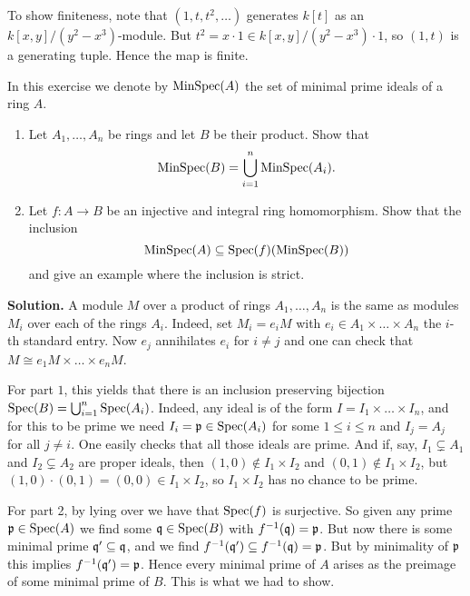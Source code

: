 \documentclass[a4paper,11pt]{article}
\begin{document}
To show finiteness, note that $(1, t, t^2, \dots)$ generates 
$k[t]$ as an $k[x,y]/(y^2-x^3)$-module. But $t^2 = x \cdot 1 \in 
k[x,y]/(y^2-x^3) \cdot 1$, so $(1,t)$ is a generating tuple. Hence the 
map is finite.

In this exercise we denote by $\operatorname{MinSpec}(A)$ the set of minimal prime ideals
of a ring $A$. 
\begin{enumerate}
    \item Let $A_1, \dots, A_n$ be rings and let $B$ be their product.
        Show that 
        \begin{equation*}
            \operatorname{MinSpec}(B) = \bigcup_{i = 1}^n \operatorname{MinSpec}(A_i).
        \end{equation*}
    \item Let $f: A\to B$ be an injective and integral ring homomorphism.
        Show that the inclusion
        \begin{equation*}
            \operatorname{MinSpec}(A) \subseteq \operatorname{Spec}(f)(\operatorname{MinSpec}(B))
        \end{equation*}
        and give an example where the inclusion is strict. 
\end{enumerate}
\textbf{Solution.} A module $M$ over a product of rings 
$A_1, \dots, A_n$ is the same as modules $M_i$ over each of the rings 
$A_i$. Indeed, set $M_i = e_i M$ with $e_i \in A_1 \times \dots \times A_n$
the $i$-th standard entry. Now $e_j$ annihilates $e_i$ for $i \neq j$
and one can check that $M \cong e_1 M \times \dots \times e_n M$. 

For part $1$, this yields that there is an inclusion preserving bijection
$\operatorname{Spec}(B) = \bigcup_{i=1}^n \operatorname{Spec}(A_i)$. Indeed, any ideal is of the 
form $I = I_1 \times \dots \times I_n$, and for this to be prime we 
need $I_i = \mathfrak{p} \in \operatorname{Spec}(A_i)$ for some $1 \leq i \leq n$ and $I_j = A_j$ for
all $j \neq i$. One easily checks that  all those ideals are prime. And if,
say, $I_1 \subsetneq A_1$ and $I_2 \subsetneq A_2$ are proper ideals, then
$(1,0) \not \in I_1 \times I_2$ and $(0,1) \not \in I_1 \times I_2$, but $(1,0)
\cdot (0,1) = (0,0) \in I_1 \times I_2$, so $I_1 \times I_2$ has no chance to
be prime.

For part 2, by lying over we have that $\operatorname{Spec}(f)$ is surjective. So given 
any prime $\mathfrak{p} \in \operatorname{Spec}(A)$ we find some $\mathfrak{q} \in \operatorname{Spec}(B)$ with
$f^{-1}(\mathfrak{q}) = \mathfrak{p}$. But now there is some minimal prime $\mathfrak{q}' \subseteq \mathfrak{q}$,
and we find $f^{-1}(\mathfrak{q}') \subseteq f^{-1}(\mathfrak{q}) = \mathfrak{p}$. But by minimality of 
$\mathfrak{p}$ this implies $f^{-1}(\mathfrak{q}') = \mathfrak{p}$. Hence every minimal prime
of $A$ arises as the preimage of some minimal prime of $B$. This is what we 
had to show. 
\end{document}
